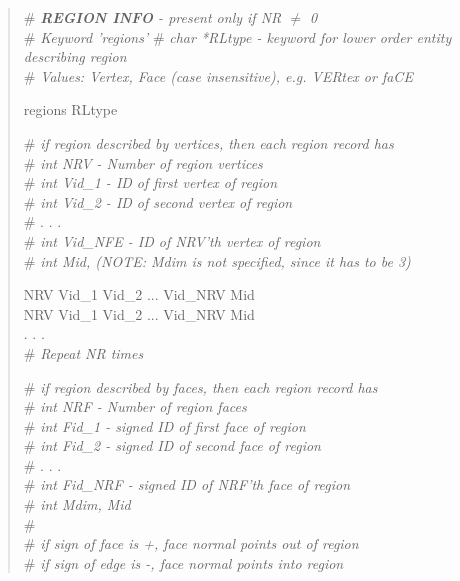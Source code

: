 \documentclass[12pt]{article}
\begin{document}
\begin{verse}
\# {\em {\bf REGION INFO} - present only if NR $\ne$ 0} \\
\# {\em Keyword 'regions'}
\# {\em char *RLtype - keyword for lower order entity describing region} \\
\# {\em Values: Vertex, Face (case insensitive), e.g. VERtex or faCE}
\vspace{1ex}

regions RLtype
\vspace{1ex}

\# {\em if region described by vertices, then each region record has} \\
\# {\em {\em int} NRV - Number of region vertices} \\
\# {\em {\em int} Vid\_1 - ID of first vertex of region} \\
\# {\em {\em int} Vid\_2 - ID of second vertex of region} \\
\# . . . \\
\# {\em {\em int} Vid\_NFE - ID of NRV'th vertex of region} \\
\# {\em {\em int} Mid, (NOTE: Mdim is not specified, since it has to be 3)}
\vspace{1ex}

NRV \hspace{0.5ex} Vid\_1 \hspace{0.5ex} Vid\_2 \hspace{0.5ex} ... \hspace{0.5ex} Vid\_NRV \hspace{0.5ex} Mid \\
NRV \hspace{0.5ex} Vid\_1 \hspace{0.5ex} Vid\_2 \hspace{0.5ex} ... \hspace{0.5ex} Vid\_NRV \hspace{0.5ex} Mid \\
. . . \\
\# {\em Repeat NR times} 
\vspace{3ex}

\# {\em if region described by faces, then each region record has} \\
\# {\em {\em int} NRF - Number of region faces} \\
\# {\em {\em int} Fid\_1 - signed ID of first face of region} \\
\# {\em {\em int} Fid\_2 - signed ID of second face of region} \\
\# . . . \\
\# {\em {\em int} Fid\_NRF - signed ID of NRF'th face of region} \\
\# {\em {\em int} Mdim, Mid} \\
\#  \\
\# {\em if sign of face is +, face normal points out of region} \\
\# {\em if sign of edge is -, face normal points into region}
\vspace{1ex}


\end{verse}
\end{document}
